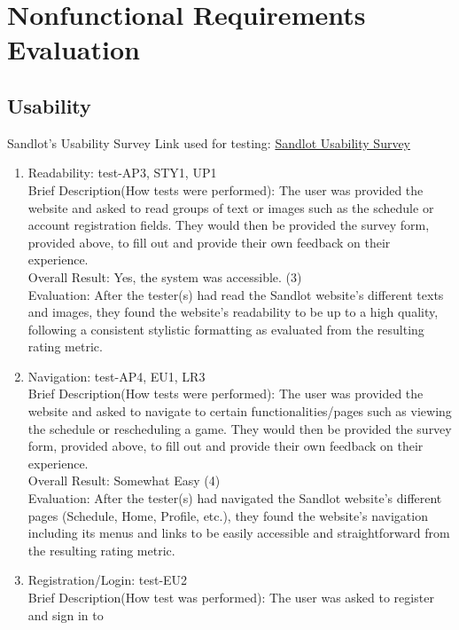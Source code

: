 \documentclass[12pt, titlepage]{article}
\begin{document}
\section{Nonfunctional Requirements Evaluation}

\subsection{Usability}

Sandlot's Usability Survey Link used for testing: \href{https://forms.office.com/Pages/ResponsePage.aspx?id=B2M3RCm0rUKMJSjNSW9HcodvkeIlB8lOjrmyIWuVT7dUQ0hBNFRVTjFHWVhITDIzSklZRDRYTVZRMi4u}{Sandlot Usability Survey}

\begin{enumerate}
  \item{Readability: test-AP3, STY1, UP1\\}
  Brief Description(How tests were performed): The user was provided the website and asked
  to read groups of text or images such as the schedule or account registration fields.
  They would then be provided the survey form, provided above, to fill out and provide their own feedback
  on their experience. \\
  Overall Result: Yes, the system was accessible. (3)\\
  Evaluation: After the tester(s) had read the Sandlot website's different texts and images,
  they found the website's readability to be up to a high quality, following a consistent
  stylistic formatting as evaluated from the resulting rating metric.
  \item{Navigation: test-AP4, EU1, LR3\\}
  Brief Description(How tests were performed): The user was provided the website and asked
  to navigate to certain functionalities/pages such as viewing the schedule or
  rescheduling a game. They would then be provided the survey form, provided above, to fill
  out and provide their own feedback on their experience. \\
  Overall Result: Somewhat Easy (4)\\
  Evaluation: After the tester(s) had navigated the Sandlot website's different pages
  (Schedule, Home, Profile, etc.), they found the website's navigation including
  its menus and links to be easily accessible and straightforward from the resulting
  rating metric.
  \item{Registration/Login: test-EU2\\}
  Brief Description(How test was performed): The user was asked to register and sign in to

\end{enumerate}
\end{document}
